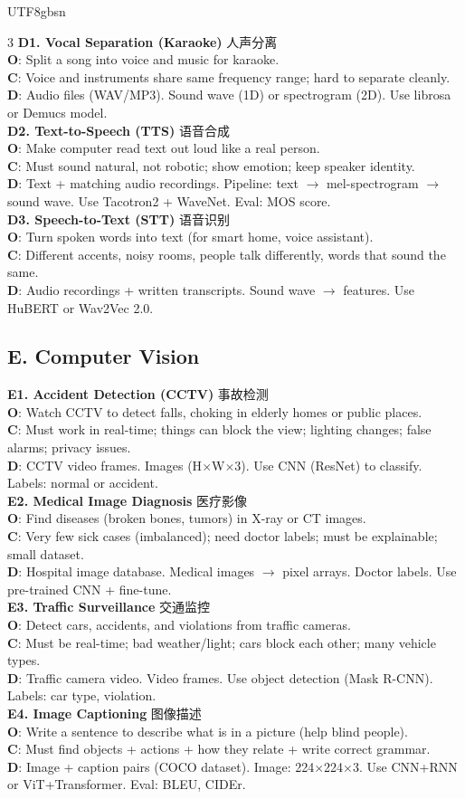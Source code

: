 \documentclass[9pt,landscape,a4paper]{article}
\newcommand{\zhint}[1]{{\scriptsize\color{gray!70!black}#1}}
\newcommand{\scenario}[5]{%
\textbf{#1} \zhint{#2}\\
\textbf{O}: #3\\
\textbf{C}: #4\\
\textbf{D}: #5\\[-3pt]
}
\begin{document}
\begin{CJK}{UTF8}{gbsn}
\begin{multicols}{3}
\scenario{D1. Vocal Separation (Karaoke)}{人声分离}
{Split a song into voice and music for karaoke.}
{Voice and instruments share same frequency range; hard to separate cleanly.}
{Audio files (WAV/MP3). Sound wave (1D) or spectrogram (2D). Use librosa or Demucs model.}

\scenario{D2. Text-to-Speech (TTS)}{语音合成}
{Make computer read text out loud like a real person.}
{Must sound natural, not robotic; show emotion; keep speaker identity.}
{Text + matching audio recordings. Pipeline: text $\to$ mel-spectrogram $\to$ sound wave. Use Tacotron2 + WaveNet. Eval: MOS score.}

\scenario{D3. Speech-to-Text (STT)}{语音识别}
{Turn spoken words into text (for smart home, voice assistant).}
{Different accents, noisy rooms, people talk differently, words that sound the same.}
{Audio recordings + written transcripts. Sound wave $\to$ features. Use HuBERT or Wav2Vec 2.0.}

\subsection{E. Computer Vision}

\scenario{E1. Accident Detection (CCTV)}{事故检测}
{Watch CCTV to detect falls, choking in elderly homes or public places.}
{Must work in real-time; things can block the view; lighting changes; false alarms; privacy issues.}
{CCTV video frames. Images (H$\times$W$\times$3). Use CNN (ResNet) to classify. Labels: normal or accident.}

\scenario{E2. Medical Image Diagnosis}{医疗影像}
{Find diseases (broken bones, tumors) in X-ray or CT images.}
{Very few sick cases (imbalanced); need doctor labels; must be explainable; small dataset.}
{Hospital image database. Medical images $\to$ pixel arrays. Doctor labels. Use pre-trained CNN + fine-tune.}

\scenario{E3. Traffic Surveillance}{交通监控}
{Detect cars, accidents, and violations from traffic cameras.}
{Must be real-time; bad weather/light; cars block each other; many vehicle types.}
{Traffic camera video. Video frames. Use object detection (Mask R-CNN). Labels: car type, violation.}

\scenario{E4. Image Captioning}{图像描述}
{Write a sentence to describe what is in a picture (help blind people).}
{Must find objects + actions + how they relate + write correct grammar.}
{Image + caption pairs (COCO dataset). Image: 224$\times$224$\times$3. Use CNN+RNN or ViT+Transformer. Eval: BLEU, CIDEr.}


\end{multicols}
\end{CJK}
\end{document}
